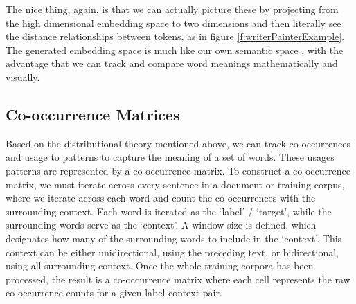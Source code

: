 The nice thing, again, is that we can actually picture these by projecting from the high dimensional embedding space to two dimensions and then literally see the distance relationships between tokens, as in figure \ref{f:writerPainterExample}. The generated embedding space is much like our own semantic space \cite{lewis2019distributional}, with the advantage that we can track and compare word meanings mathematically and visually.


\subsection{Co-occurrence Matrices}



Based on the distributional theory mentioned above, we can track co-occurrences and usage to patterns to capture the meaning of a set of words. These usages patterns are represented by a co-occurrence matrix. To construct a co-occurrence matrix, we must iterate across every sentence in a document or training corpus, where we iterate across each word and count the co-occurrences with the surrounding context. Each word is iterated as the `label' / `target', while the surrounding words serve as the `context'. A window size is defined, which designates how many of the surrounding words to include in the `context'. This context can be either unidirectional, using the preceding text, or bidirectional, using all surrounding context. Once the whole training corpora has been processed, the result is a co-occurrence matrix where each cell represents the raw co-occurrence counts for a given label-context pair. 

